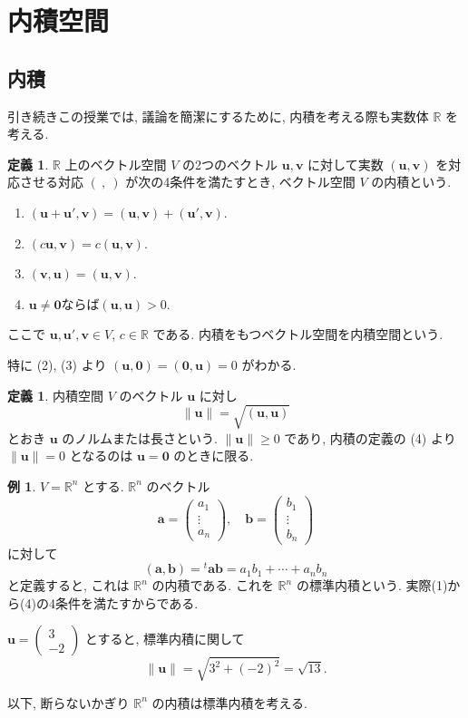 \documentclass[dvipdfmx,a4paper,11pt]{article} %
\theoremstyle{definition}
\newtheorem{defn}[thm]{定義}
\newtheorem{ex}[thm]{例}
\begin{document}
\newpage


\section{内積空間 \cite[6章]{M}}

\subsection{内積 \cite[6.1節]{M}}

引き続きこの授業では, 議論を簡潔にするために, 内積を考える際も実数体 $\mathbb{R}$ を考える. 

\begin{defn}
$\mathbb{R}$ 上のベクトル空間 $V$ の2つのベクトル $\bm{u},\bm{v}$ に対して実数 $(\bm{u},\bm{v})$ を対応させる対応 $(\ ,\ )$ が次の4条件を満たすとき, ベクトル空間 $V$ の内積という.

\begin{enumerate}
\item $(\bm{u}+\bm{u}',\bm{v})=(\bm{u},\bm{v})+(\bm{u}',\bm{v})$.
\item $(c\bm{u},\bm{v})=c(\bm{u},\bm{v})$.
\item $(\bm{v},\bm{u})=(\bm{u},\bm{v})$.
\item $\bm{u}\neq\bm{0}$ならば$(\bm{u},\bm{u})>0$.
\end{enumerate}
ここで $\bm{u},\bm{u}',\bm{v}\in V$, $c\in\mathbb{R}$ である. 内積をもつベクトル空間を内積空間という.
\end{defn}

特に (2), (3) より
\(
(\bm{u},\bm{0})=(\bm{0},\bm{u})=0
\)
がわかる.


\begin{defn}
内積空間 $V$ のベクトル $\bm{u}$ に対し 
\[
\lVert \bm{u}\rVert=\sqrt{(\bm{u},\bm{u})}
\]
とおき $\bm{u}$ のノルムまたは長さという.
$\lVert \bm{u}\rVert\geq0$ であり, 内積の定義の (4) より $\lVert \bm{u}\rVert=0$ となるのは $\bm{u}=\bm{0}$ のときに限る.
\end{defn}


\begin{ex}

$V=\mathbb{R}^n$ とする. $\mathbb{R}^n$ のベクトル
\[
\bm{a}=
\begin{pmatrix}
a_1\\
\vdots\\
a_n
\end{pmatrix},
\quad
\bm{b}=
\begin{pmatrix}
b_1\\
\vdots\\
b_n
\end{pmatrix}
\]
に対して
\[
(\bm{a},\bm{b})={}^{t}\!\bm{a}\bm{b}=a_1b_1+\cdots+a_nb_n
\]
と定義すると, これは $\mathbb{R}^n$ の内積である. これを $\mathbb{R}^n$ の標準内積という.
実際(1)から(4)の4条件を満たすからである. 

\(
\bm{u}=
\begin{pmatrix}
3\\
-2
\end{pmatrix}
\)
とすると, 標準内積に関して
\[
\lVert \bm{u}\rVert=\sqrt{3^2+(-2)^2}=\sqrt{13}.
\]

以下, 断らないかぎり $\mathbb{R}^n$ の内積は標準内積を考える.
\end{ex}
\end{document}
